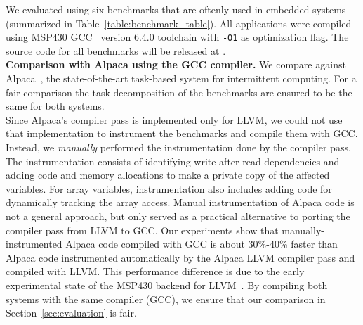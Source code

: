 We evaluated \sys using six benchmarks that are oftenly used in embedded systems (summarized in
Table~\ref{table:benchmark_table}). All applications were compiled using MSP430 GCC~\cite{ti-gcc} version 6.4.0 toolchain with \texttt{-O1} as optimization flag. The source code for all benchmarks will be released at \cite{coala_website}.\\
%
\textbf{Comparison with Alpaca using the GCC compiler.} We compare
\sys against Alpaca~\cite{alpaca}, the state-of-the-art task-based system for
intermittent computing. For a fair comparison the task decomposition of the benchmarks are ensured to be the
same for both systems.\\
%
Since Alpaca's compiler pass is implemented only for LLVM, we could not use
that implementation to instrument the benchmarks and compile them with GCC.
Instead, we \emph{manually} performed the instrumentation done by the compiler
pass. The instrumentation consists of identifying write-after-read dependencies 
and adding code and memory allocations to make a private copy of the affected variables. 
For array variables, instrumentation also includes adding code for 
dynamically tracking the array access. Manual instrumentation of Alpaca code is not a general approach, 
but only served as a practical alternative to porting the compiler pass from LLVM to GCC.
%
Our experiments show that manually-instrumented Alpaca code compiled with GCC
is about 30\%-40\% faster than Alpaca code instrumented automatically by the
Alpaca LLVM compiler pass and compiled with LLVM. This performance difference
is due to the early experimental state of the MSP430 backend for
LLVM~\cite{baghsorkhi_cgo_2018}.
%
By compiling both systems with the same compiler (GCC), we ensure that our
comparison in Section~\ref{sec:evaluation} is fair.